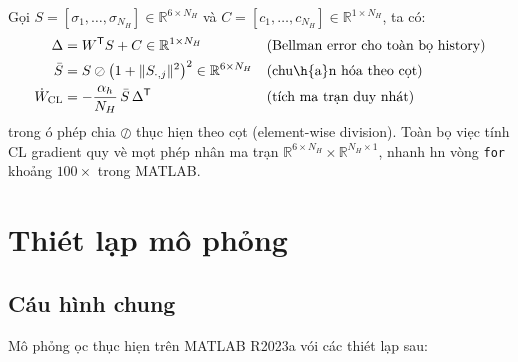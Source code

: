 \documentclass[12pt,a4paper]{article}
\newcommand{\R}{\mathbb{R}}
\newcommand{\T}{\mathsf{T}}
\begin{document}
G\d{o}i $S = [\sigma_1, \ldots, \sigma_{N_H}] \in \R^{6 \times N_H}$ v\`{a} $C = [c_1, \ldots, c_{N_H}] \in \R^{1 \times N_H}$, ta c\'{o}:
\begin{align}
    \Delta &= W^\T S + C \in \R^{1 \times N_H} & &\text{(Bellman error cho to\`{a}n b\d{o} history)} \\
    \bar{S} &= S \oslash \big(1 + \|S_{\cdot,j}\|^2\big)^2 \in \R^{6 \times N_H} & &\text{(chu\h{a}n h\'{o}a theo c\d{o}t)} \\
    \dot{W}_\text{CL} &= -\frac{\alpha_h}{N_H}\, \bar{S}\, \Delta^\T & &\text{(t\'{i}ch ma tr\d{a}n duy nh\'{a}t)}
\end{align}
trong \dj\'{o} ph\'{e}p chia $\oslash$ th\d{u}c hi\d{e}n theo c\d{o}t (element-wise division). To\`{a}n b\d{o} vi\d{e}c t\'{i}nh CL gradient quy v\`{e} m\d{o}t ph\'{e}p nh\^{a}n ma tr\d{a}n $\R^{6 \times N_H} \times \R^{N_H \times 1}$, nhanh h\ohorn{}n v\`{o}ng \texttt{for} kho\h{a}ng $100\times$ trong MATLAB.

\section{Thi\'{e}t l\d{a}p m\^{o} ph\h{o}ng}

\subsection{C\'{a}u h\`{i}nh chung}

M\^{o} ph\h{o}ng \dj\uhorn{}\d{o}c th\d{u}c hi\d{e}n tr\^{e}n MATLAB R2023a v\'{o}i c\'{a}c thi\'{e}t l\d{a}p sau:
\end{document}
